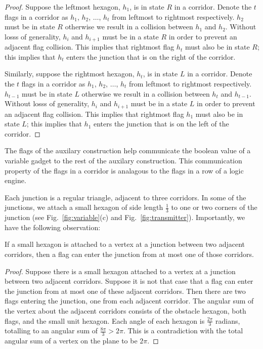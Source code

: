 \begin{proof}
Suppose the leftmost hexagon, $h_1$, is in state $R$ in a corridor.
Denote the $t$ flags in a corridor as $h_1$, $h_2$, $\ldots$, $h_t$ from leftmost to rightmost respectively.
$h_2$ must be in state $R$ otherwise we result in a collision between $h_1$ and $h_2$.
Without losss of generality, $h_i$ and $h_{i+1}$ must be in a state $R$ in order to prevent an adjacent flag collision. 
This implies that rightmost flag $h_t$ must also be in state $R$; this implies that $h_t$ enters the junction that is on the right of the corridor.

Similarly, suppose the rightmost hexagon, $h_t$, is in state $L$ in a corridor.
Denote the $t$ flags in a corridor as $h_1$, $h_2$, $\ldots$, $h_t$ from leftmost to rightmost respectively.
$h_{t-1}$ must be in state $L$ otherwise we result in a collision between $h_t$ and $h_{t-1}$.
Without losss of generality, $h_i$ and $h_{i+1}$ must be in a state $L$ in order to prevent an adjacent flag collision. 
This implies that rightmost flag $h_1$ must also be in state $L$; this implies that $h_1$ enters the junction that is on the left of the corridor.
\end{proof}
The flags of the auxilary construction help communicate the boolean value of a variable gadget to the rest of the auxilary construction.
This communication property of the flags in a corridor is analagous to the flags in a row of a logic engine.

Each junction is a regular triangle, adjacent to three corridors. 
In some of the junctions, we attach a small hexagon of side length $\frac{1}{3}$ to one or two corners of the junction (see Fig.~\ref{fig:variable}(c) and Fig.~\ref{fig:transmitter}). 
Importantly, we have the following observation:
\begin{observation}\label{obs:junction}
If a small hexagon is attached to a vertex at a junction between two adjacent corridors, then a flag can enter the junction from at most one of those corridors.
\end{observation}
\begin{proof}
Suppose there is a small hexagon attached to a vertex at a junction between two adjacent corridors.
Suppose it is not that case that a flag can enter the junction from at most one of these adjacent corridors.
Then there are two flags entering the junction, one from each adjacent corridor.
The angular sum of the vertex about the adjacent corridors consists of the obstacle hexagon, both flags, and the small unit hexagon.
Each angle of each hexagon is $\frac{2 \pi}{3}$ radians, totalling to an angular sum of $\frac{8 \pi}{3} > 2 \pi$.
This is a contradiction with the total angular sum of a vertex on the plane to be $2 \pi$.
\end{proof}

